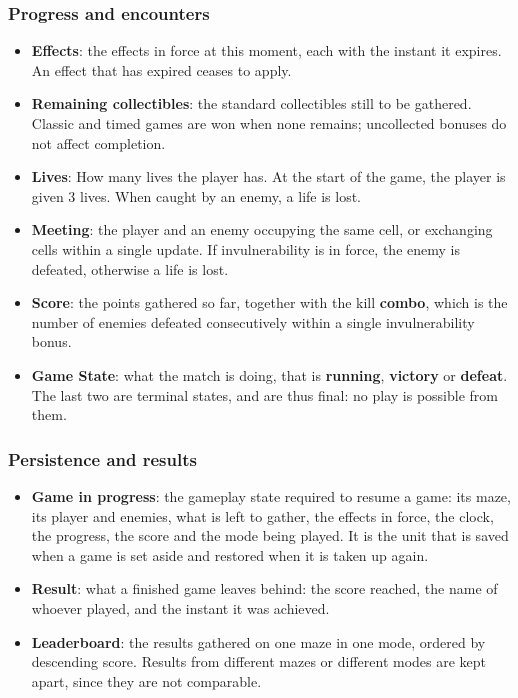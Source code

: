 \subsubsection{Progress and encounters}

\begin{itemize}
  \item \textbf{Effects}: the effects in force at this moment, each with the instant it expires. An effect that has
  expired ceases to apply.
  \item \textbf{Remaining collectibles}: the standard collectibles still to be gathered. Classic and timed games are
  won when none remains; uncollected bonuses do not affect completion.
  \item \textbf{Lives}: How many lives the player has. At the start of the game, the player is given 3 lives. When
  caught by an enemy, a life is lost.
  \item \textbf{Meeting}: the player and an enemy occupying the same cell, or exchanging cells within a single
  update. If invulnerability is in force, the enemy is defeated, otherwise a life is lost.
  \item \textbf{Score}: the points gathered so far, together with the kill \textbf{combo}, which is the number
  of enemies defeated consecutively within a single invulnerability bonus.
  \item \textbf{Game State}: what the match is doing, that is \textbf{running}, \textbf{victory}
  or \textbf{defeat}. The last two are terminal states, and are thus final: no play is possible from them.
\end{itemize}

\subsubsection{Persistence and results}

\begin{itemize}
  \item \textbf{Game in progress}: the gameplay state required to resume a game: its maze, its player and enemies, what
  is left to gather, the effects in force, the clock, the progress, the score and the mode being played. It is
  the unit that is saved when a game is set aside and restored when it is taken up again.
  \item \textbf{Result}: what a finished game leaves behind: the score reached, the name of whoever played, and the
  instant it was achieved.
  \item \textbf{Leaderboard}: the results gathered on one maze in one mode, ordered by descending score. Results
  from different mazes or different modes are kept apart, since they are not comparable.
\end{itemize}

